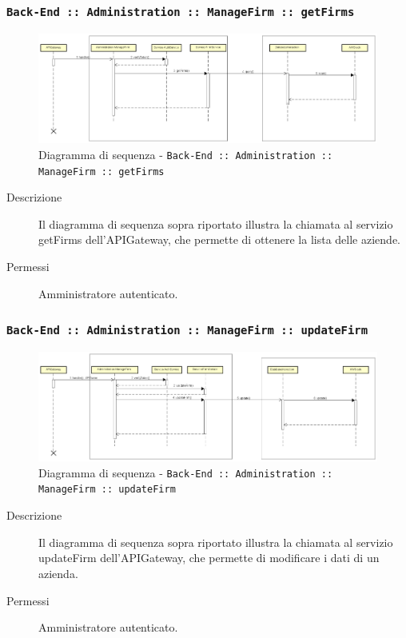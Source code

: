 \documentclass[../DefinizioneDiProdotto_v2.0.0.tex]{subfiles}
\begin{document}
\newpage
\subsubsection{\texttt{Back-End :: Administration :: ManageFirm :: getFirms}}
\begin{figure}[!h]
	\centering
	\includegraphics[scale=0.3]{DiagrammiSequenza/Back-End/manageFirm/getFirms.png}
	\caption{Diagramma di sequenza - \texttt{Back-End :: Administration :: ManageFirm :: getFirms }}
\end{figure}
\begin{description}
	\item [Descrizione] Il diagramma di sequenza sopra riportato illustra la chiamata al servizio getFirms dell'APIGateway, che permette di ottenere la lista delle aziende.
	\item [Permessi] Amministratore autenticato.
\end{description}

\subsubsection{\texttt{Back-End :: Administration :: ManageFirm :: updateFirm}}
\begin{figure}[!h]
	\centering
	\includegraphics[scale=0.3]{DiagrammiSequenza/Back-End/manageFirm/updateFirm.png}
	\caption{Diagramma di sequenza - \texttt{Back-End :: Administration :: ManageFirm :: updateFirm }}
\end{figure}
\begin{description}
	\item [Descrizione] Il diagramma di sequenza sopra riportato illustra la chiamata al servizio updateFirm dell'APIGateway, che permette di modificare i dati di un azienda.
	\item [Permessi] Amministratore autenticato.
\end{description}
\end{document}
